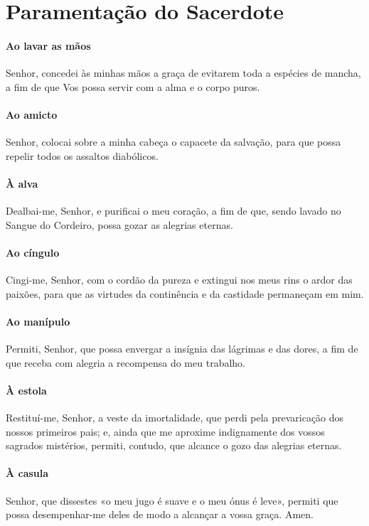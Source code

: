 \section{Paramentação do Sacerdote}

\paragraph{Ao lavar as mãos}

Senhor, concedei às minhas mãos a graça de evitarem toda a espécies de mancha, a fim de que Vos possa servir com a alma e o corpo puros.

\paragraph{Ao amicto}

Senhor, colocai sobre a minha cabeça o capacete da salvação, para que possa repelir todos os assaltos diabólicos.

\paragraph{À alva}

Dealbai-me, Senhor, e purificai o meu coração, a fim de que, sendo lavado no Sangue do Cordeiro, possa gozar as alegrias eternas.

\paragraph{Ao cíngulo}

Cingi-me, Senhor, com o cordão da pureza e extingui nos meus rins o ardor das paixões, para que as virtudes da continência e da castidade permaneçam em mim.

\paragraph{Ao manípulo}

Permiti, Senhor, que possa envergar a insígnia das lágrimas e das dores, a fim de que receba com alegria a recompensa do meu trabalho.

\paragraph{À estola}

Restituí-me, Senhor, a veste da imortalidade, que perdi pela prevaricação dos nossos primeiros pais; e, ainda que me aproxime indignamente dos vossos sagrados mistérios, permiti, contudo, que alcance o gozo das alegrias eternas.

\paragraph{À casula}

Senhor, que dissestes «o meu jugo é suave e o meu ónus é leve», permiti que possa desempenhar-me deles de modo a alcançar a vossa graça. Amen.
